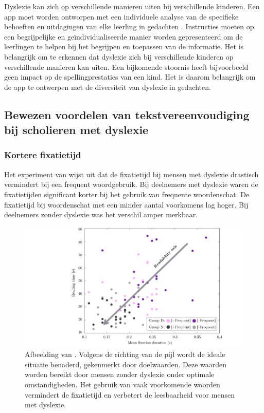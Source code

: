 Dyslexie kan zich op verschillende manieren uiten bij verschillende kinderen. Een app moet worden ontworpen met een individuele analyse van de specifieke behoeften en uitdagingen van elke leerling in gedachten \autocite{Uhry2008}. Instructies moeten op een begrijpelijke en geïndividualiseerde manier worden gepresenteerd om de leerlingen te helpen bij het begrijpen en toepassen van de informatie. Het is belangrijk om te erkennen dat dyslexie zich bij verschillende kinderen op verschillende manieren kan uiten. Een bijkomende stoornis heeft bijvoorbeeld geen impact op de spellingprestaties van een kind. Het is daarom belangrijk om de app te ontwerpen met de diversiteit van dyslexie in gedachten.

\subsection{Bewezen voordelen van tekstvereenvoudiging bij scholieren met dyslexie}

\subsubsection{Kortere fixatietijd}

Het experiment van \textcite{Rello2013} wijst uit dat de fixatietijd bij mensen met dyslexie drastisch vermindert bij een frequent woordgebruik. Bij deelnemers met dyslexie waren de fixatietijden significant korter bij het gebruik van frequente woordenschat. De fixatietijd bij woordenschat met een minder aantal voorkomens lag hoger. Bij deelnemers zonder dyslexie was het verschil amper merkbaar.

\begin{figure}
	\includegraphics[width=\linewidth]{img/readability-mean-fixation-duration.png}
	\caption{Afbeelding van \textcite{Rello2013}. Volgens de richting van de pijl wordt de ideale situatie benaderd, gekenmerkt door doelwaarden. Deze waarden worden bereikt door mensen zonder dyslexie onder optimale omstandigheden. Het gebruik van vaak voorkomende woorden vermindert de fixatietijd en verbetert de leesbaarheid voor mensen met dyslexie.}
\end{figure}


